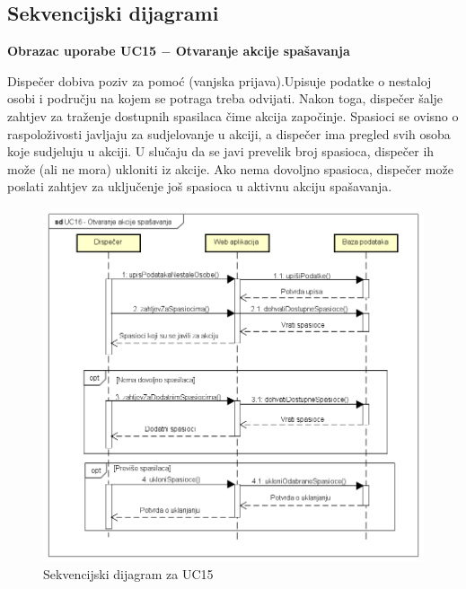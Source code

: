 			\subsection{Sekvencijski dijagrami}
			\begin{packed_item}
				
				
				\item \textbf{Obrazac uporabe UC15 $-$ Otvaranje akcije spašavanja}
				\\
				\item[] \begin{packed_item}
					{Dispečer dobiva poziv za pomoć (vanjska prijava).Upisuje podatke o nestaloj osobi i području na kojem se potraga treba odvijati. Nakon toga, dispečer šalje zahtjev za traženje dostupnih spasilaca čime akcija započinje. Spasioci se ovisno o raspoloživosti javljaju za sudjelovanje u akciji, a dispečer ima pregled svih osoba koje sudjeluju u akciji. U slučaju da se javi prevelik broj spasioca, dispečer ih može (ali ne mora) ukloniti iz akcije. Ako nema dovoljno spasioca, dispečer može poslati zahtjev za uključenje još spasioca u aktivnu akciju spašavanja.}
					
					\begin{figure}[h!]
						\centering
						\includegraphics[width=\textwidth]{./slike/UC15.png}
						\caption{Sekvencijski dijagram za UC15}
						
					\end{figure}
					\eject
				\end{packed_item}
				\newpage
					

\end{packed_item}

